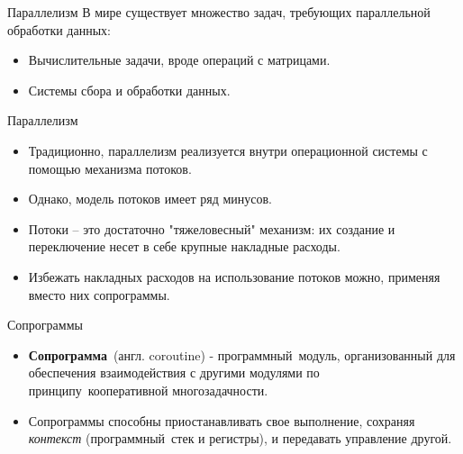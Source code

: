 
{
\begin{frame}[noframenumbering]
		\titlepage
\end{frame}
}

\begin{frame}{Параллелизм}
	В мире существует множество задач, требующих параллельной обработки данных:
	\begin{itemize}
		\item Вычислительные задачи, вроде операций с матрицами.
		\item Системы сбора и обработки данных.
	\end{itemize}
\end{frame}

\begin{frame}{Параллелизм}
	\begin{itemize}
	\item Традиционно, параллелизм реализуется внутри операционной системы с помощью механизма потоков.
	\item Однако, модель потоков имеет ряд минусов. 
	\item Потоки -- это достаточно "тяжеловесный" механизм: их создание и переключение несет в себе крупные накладные расходы. 
	\item Избежать накладных расходов на использование потоков можно, применяя вместо них сопрограммы. 
	\end{itemize}
\end{frame}

\begin{frame}{Сопрограммы}
	\begin{itemize}
		\item \textbf{Сопрограмма} (англ. coroutine) - программный модуль, организованный для обеспечения взаимодействия с другими модулями по принципу кооперативной многозадачности.
		
		\item Сопрограммы способны приостанавливать свое выполнение, сохраняя
		\textit{контекст} (программный стек и регистры), и передавать управление другой.
	\end{itemize}
\end{frame}

